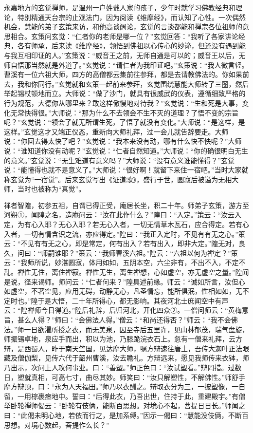 \documentclass[12pt,twoside,openany]{book}
\newcommand{\kai}[1]{{\CJKfamily{kai}#1}}
\begin{document}
\kai{永嘉地方的玄觉禅师，是温州一户姓戴人家的孩子，少年时就学习佛教经典和理论，特别精通天台宗的止观法门，因为阅读《维摩经》，而认知了心性。一次偶然机会，慧能的弟子玄策来访，和他高谈阔论，玄觉的言谈都能和禅宗各位祖师的意思相合。玄策问玄觉：“仁者你的老师是哪一位？”玄觉回答：“我听了各家讲论经典，各有师承，后来读《维摩经》，领悟到佛祖以心传心的妙谛，但还没有遇到能与我互相印证的人。”玄策说：“威音王之前，无师自通是可以的；威音王以后，无师自悟那当然就是外道了。”玄觉说：“请仁者为我印证吧。”玄策说：“我人微言轻。曹溪有一位六祖大师，四方的高僧都云集前往参拜，都是去请教佛法的。你如果前去，我和你同行。”玄觉就和玄策一起前来参拜，玄觉围绕慧能大师转了三圈，然后举起锡杖顿地而立。大师说：“做了沙门，就具有很威武的仪表，遵循细致严格的行为规范，大德你从哪里来？敢这样傲慢地对待我？”玄觉说：“生和死是大事，变化无常快得很。”大师说：“那为什么不去领会不生不灭的道理？了悟不变的宗旨呢？”玄觉说：“领会了就无所谓生死，了悟了就没有变化。”大师说：“是这样，是这样。”玄觉这才又端正仪态，重新向大师礼拜，过一会儿就告辞要走。大师说：“你回去得太快了吧？”玄觉说：“我本来没有动，哪有什么快不快呢？”大师说：“谁知道你没有动呢？”玄觉说：“仁者自然知道。”大师说：“你的确很明白无生的意义。”玄觉说：“无生难道有意义吗？”大师说：“没有意义谁能懂得？”玄觉说：“能懂得也就不是意义了。”大师说：“很好啊！就留下来住一宿吧。”当时大家就称玄觉为“一宿觉”。后来玄觉写出《证道歌》，盛行于世，圆寂后被谥为无相大师，当时也被称为“真觉”。}

禅者智隍，初参五祖，自谓已得正受，庵居长坐，积二十年。师弟子玄策，游方至河朔①，闻隍之名，造庵问云：“汝在此作什么？”隍曰：“入定。”策云：“汝云入定，为有心入耶？无心入耶？若无心入者，一切无情草木瓦石，应合得定。若有心入者，一切有情含识之流，亦应得定。”隍曰：“我正入定时，不见有有无之心。”策云：“不见有有无之心，即是常定，何有出入？若有出入，即非大定。”隍无对，良久，问曰：“师嗣谁耶？”策云：“我师曹溪六祖。”隍云：“六祖以何为禅定？”策云：“我师所说，妙湛圆寂，体用如如，五阴本空，六尘非有，不出不入，不定不乱。禅性无住，离住禅寂。禅性无生，离生禅想，心如虚空，亦无虚空之量。”隍闻是说，径来谒师。师问云：“仁者何来？”隍具述前缘。师云：“诚如所言，汝但心如虚空，不著空见，应用无碍，动静无心，凡圣情忘，能所俱泯，性相如如，无不定时也。”隍于是大悟，二十年所得心，都无影响。其夜河北士庶闻空中有声云：“隍禅师今日得道。”隍后礼辞，后归河北，开化四众②。一僧问师云：“黄梅意旨，甚么人得？”师曰：“会佛法人得。”僧云：“和尚还得否？”师云：“我不会佛法。”师一日欲濯所授之衣，而无美泉，因至寺后五里许，见山林郁茂，瑞气盘旋，师振锡卓地，泉应手而出，积以为池，乃膝跪浣衣石上。忽有一僧来礼拜，云方辩，是西蜀人，昨于南天竺国，见达摩大师，嘱方辩速往唐土，吾传大迦叶正法眼藏及僧伽梨，见传六代于韶州曹溪，汝去瞻礼。方辩远来，愿见我师传来衣钵，师乃出示，次问上人攻何事业。曰：“善塑。”师正色曰：“汝试塑看。”辩罔措。过数日，塑就真相，可高七寸，曲尽其妙。师笑曰：“汝只解塑性，不解佛性。”师舒手摩方辩顶，曰：“永为人天福田。”师乃以衣酬之。辩取衣分为三，一披塑像，一自留，一用棕裹瘗地中。誓曰：“后得此衣，乃吾出世，住持于此，重建殿宇。”有僧举卧轮禅师偈云：“卧轮有伎俩，能断百思想。对境心不起，菩提日日长。”师闻之曰：“此偈未明心地，若依而行之，是加系缚。”因示一偈曰：“慧能没伎俩，不断百思想。对境心数起，菩提作么长？”
\end{document}

